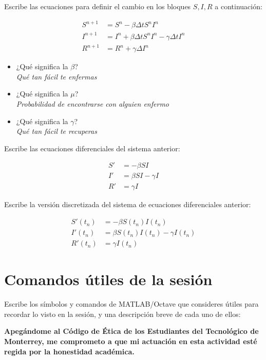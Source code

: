 \documentclass[spanish, 10pt]{article}
\begin{document}
Escribe las ecuaciones para definir el cambio en los bloques $S, I, R$ a continuación:

\begin{align*}
    S^{n+1} & = S^n - \beta \Delta t S^n I^n \\
    I^{n+1} & = I^n + \beta \Delta t S^n I^n - \gamma \Delta t I^n \\
    R^{n+1} & = R^n + \gamma \Delta I^n
\end{align*}

\begin{itemize}
    \item ¿Qué significa la $\beta$? \\[1ex] \textit{Qué tan fácil te enfermas}
    \item ¿Qué significa la $\mu$? \\[1ex] \textit{Probabilidad de encontrarse con alguien enfermo}
    \item ¿Qué significa la $\gamma$? \\[1ex] \textit{Qué tan fácil te recuperas}
\end{itemize}

\pagebreak

Escribe las ecuaciones diferenciales del sistema anterior:

\begin{align*}
S' & =- \beta S I \\
I' & =\beta S I - \gamma I \\
R' & =\gamma I
\end{align*}

Escribe la versión discretizada del sistema de ecuaciones diferenciales anterior:

\begin{align*}
    S'(t_n) & =- \beta S(t_n) I(t_n) \\
    I'(t_n) & =\beta S(t_n) I(t_n) - \gamma I(t_n) \\
    R'(t_n) & =\gamma I(t_n)
\end{align*}

\section{Comandos útiles de la sesión}

Escribe los símbolos y comandos de MATLAB/Octave que consideres útiles para recordar lo visto en la sesión, y una descripción breve de cada uno de ellos:

\vfill

\textbf{Apegándome al Código de Ética de los Estudiantes del Tecnológico de Monterrey, me comprometo a que mi actuación en esta actividad esté regida por la honestidad académica.}
\end{document}
